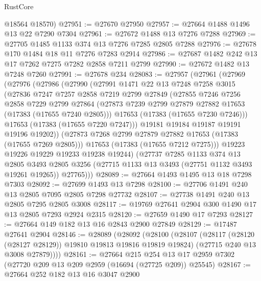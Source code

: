 \begin{lexlean}{RustCore}
\begin{coremodule}
      @18564
      @18570)
@27951 := @27670 @27950
@27957 := @27664 @1488 @1496 @13 @22 @7290 @7304
@27961 := @27672 @1488 @13 @7276 @7288
@27969 := @27705 @1485 @1133 @374 @13 @7276 @7285 @2805 @7288
@27976 := @27678 @170 @1484 @18 @11 @7276 @7283 @2914
@27986 := @27687 @1482 @242 @13 @17 @7262 @7275 @7282 @2858 @7211 @2799
@27990 := @27672 @1482 @13 @7248 @7260
@27991 := @27678 @234
@28083 := @27957
    (@27961
      (@27969
        (@27976
          (@27986
            (@27990
              (@27991
                @1471
                @22
                @13
                @7248
                @7258
                @3015
                (@27836
                  @7247
                  @7257
                  @2858
                  @7219
                  @2799
                  @27849
                  (@27855
                    @7246
                    @7256
                    @2858
                    @7229
                    @2799
                    @27864
                    (@27873 @7239 @2799 @27879 @27882 @17653 (@17383 (@17655 @7240 @2805)))
                    @17653
                    (@17383 (@17655 @7230 @7246)))
                  @17653
                  (@17383 (@17655 @7220 @7247)))
                @19181
                @19184
                @19187
                @19191
                @19196
                @19202))
            (@27873 @7268 @2799 @27879 @27882 @17653 (@17383 (@17655 @7269 @2805)))
            @17653
            (@17383 (@17655 @7212 @7275)))
          @19223
          @19226
          @19229
          @19233
          @19238
          @19244)
        (@27737
          @7285
          @1133
          @374
          @13
          @2805
          @3493
          @2805
          @3256
          (@27715 @1133 @13 @3493 (@27751 @1132 @3493 @19261 @19265))
          @27765)))
@28089 := @27664 @1493 @1495 @13 @18 @7298 @7303
@28092 := @27699 @1493 @13 @7298
@28100 := @27706 @1491 @240 @13 @2805 @7095 @2805 @7298 @27732
@28107 := @27738 @1491 @240 @13 @2805 @7295 @2805 @3008
@28117 := @19769 @27641 @2904 @300 @1490 @17 @13 @2805 @7293 @2924 @2315
@28120 := @27659 @1490 @17 @7293
@28127 := @27664 @149 @182 @13 @16 @2843 @2900 @27849
@28129 := @17487 @27641 @2904
@28146 := @28089
    (@28092
      (@28100
        (@28107
          (@28117 (@28120 (@28127 @28129)) @19810 @19813 @19816 @19819 @19824)
          (@27715 @240 @13 @3008 @27879))))
@28161 := @27664
    @215
    @254
    @13
    @17
    @2959
    @7302
    (@27720 @209 @13 @209 @2959 (@16694 (@27725 @209)) @25545)
@28167 := @27664 @252 @182 @13 @16 @3047 @2900

\end{coremodule}
\end{lexlean}
